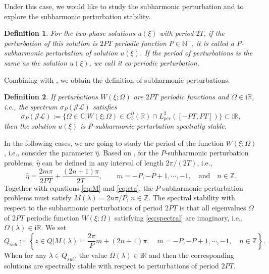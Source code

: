 \documentclass[11pt,reqno]{amsart}
\newcommand{\ii}{\mathrm{i}}
\newtheorem{define}{Definition}
\numberwithin{equation}{section}
\begin{document}
Under this case, we would like to study the subharmonic perturbation and to explore the subharmonic perturbation stability.

\begin{define}\label{defin:P-sub} 
	For the two-phase solutions $u(\xi)$ with period $2T$, 
	if the perturbation of this solution is $2PT$ periodic function $P\in \mathbb{N}^{+}$, 
	it is called a P-subharmonic perturbation of solution $u(\xi)$. 
	If the period of perturbations is the same as the solution $u(\xi)$, we call it co-periodic perturbation.
\end{define}

Combining  with , we obtain the definition of subharmonic perturbations.

\begin{define}\label{define:spect-P}
	If perturbations $W(\xi;\Omega)$ are $2PT$ periodic functions and $\Omega\in \ii \mathbb{R}$, 
	i.e., the spectrum $\sigma_P(\mathcal{JL})$ satisfies 
	\begin{equation}\nonumber
		\sigma_P(\mathcal{JL}):=\{\Omega\in \mathbb{C}| W(\xi;\Omega)\in C^0_b(\mathbb{R})\cap L^2_{per}([-PT,PT]) \} \subset \ii \mathbb{R},
	\end{equation} 
	then the solution $u(\xi)$ is P-subharmonic perturbation spectrally stable.
\end{define}
 
In the following cases, we are going to study the period of the function $W(\xi;\Omega)$, i.e., consider the parameter $\hat{\eta}$.
Based on , for the $P$-subharmonic perturbation problems,
$\hat{\eta}$ can be defined in any interval of length $2\pi/(2T)$, i.e.,
\begin{equation}\label{eq:eta}
		\hat{\eta}=\frac{2m\pi}{2PT}+\frac{(2n+1)\pi}{2T} ,\qquad m=-P,-P+1,\cdots,-1, \quad \text{and} \quad n\in \mathbb{Z}.
\end{equation}
Together with equations \eqref{eq:M} and \eqref{eq:eta}, the $P$-subharmonic perturbation problems must satisfy $M(\lambda)=2 n\pi /P$, $n\in \mathbb{Z}$. 
The spectral stability with respect to the subharmonic perturbations of period $2PT$ is that all eigenvalues $\Omega$ of $2PT$ periodic function $W(\xi;\Omega)$ satisfying \eqref{eq:spectral} are imaginary, i.e., $\Omega(\lambda)\in \ii \mathbb{R}$. 
We set 
\begin{equation}\label{eq:Q_P}
		Q_{sub}:=\left\{ z\in Q|M(\lambda)=\frac{2\pi}{P}m+(2n+1)\pi, \quad m=-P,-P+1,\cdots,-1, \quad n \in \mathbb{Z}\right\}.
\end{equation}
When for any $\lambda\in Q_{sub}$, the value $\Omega(\lambda)\in \ii \mathbb{R}$ and then the corresponding solutions are spectrally stable with respect to perturbations of period $2PT$. 
\end{document}

